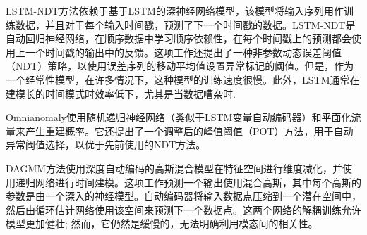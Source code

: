


LSTM-NDT\cite{lstm-ndt}方法依赖于基于LSTM的深神经网络模型，该模型将输入序列用作训练数据，并且对于每个输入时间戳，预测了下一个时间戳的数据。LSTM-NDT是自动回归神经网络，在顺序数据中学习顺序依赖性，在每个时间戳上的预测都会使用上一个时间戳的输出中的反馈。这项工作还提出了一种非参数动态误差阈值（NDT）策略，以使用误差序列的移动平均值设置异常标记的阈值。但是，作为一个经常性模型，在许多情况下，这种模型的训练速度很慢。此外，LSTM通常在建模长的时间模式时效率低下，尤其是当数据嘈杂时.

Omnianomaly\cite{Omnianomaly}使用随机递归神经网络（类似于LSTM变量自动编码器）和平面化流量来产生重建概率。它还提出了一个调整后的峰值阈值（POT）方法，用于自动异常阈值选择，以优于先前使用的NDT方法。

DAGMM\cite{dagmm}方法使用深度自动编码的高斯混合模型在特征空间进行维度减化，并使用递归网络进行时间建模。这项工作预测一个输出使用混合高斯，其中每个高斯的参数是由一个深入的神经模型。自动编码器将输入数据点压缩到一个潜在空间中，然后由循环估计网络使用该空间来预测下一个数据点。这两个网络的解耦训练允许模型更加健壮; 然而，它仍然是缓慢的，无法明确利用模态间的相关性。


